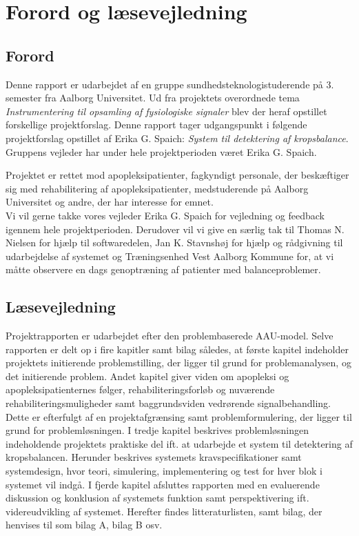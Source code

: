 \chapter*{Forord og læsevejledning}
\section*{Forord}
Denne rapport er udarbejdet af en gruppe sundhedsteknologistuderende på 3. semester fra Aalborg Universitet. Ud fra projektets overordnede tema \textit{Instrumentering til opsamling af fysiologiske signaler} blev der heraf opstillet forskellige projektforslag. Denne rapport tager udgangspunkt i følgende projektforslag opstillet af Erika G. Spaich: \textit{System til detektering af kropsbalance}. Gruppens vejleder har under hele projektperioden været Erika G. Spaich.

Projektet er rettet mod apopleksipatienter, fagkyndigt personale, der beskæftiger sig med rehabilitering af apopleksipatienter, medstuderende på Aalborg Universitet og andre, der har interesse for emnet. \\
Vi vil gerne takke vores vejleder Erika G. Spaich for vejledning og feedback igennem hele projektperioden. Derudover vil vi give en særlig tak til Thomas N. Nielsen for hjælp til softwaredelen, Jan K. Stavnshøj for hjælp og rådgivning til udarbejdelse af systemet og Træningsenhed Vest Aalborg Kommune for, at vi måtte observere en dags genoptræning af patienter med balanceproblemer. 

\section*{Læsevejledning}
Projektrapporten er udarbejdet efter den problembaserede AAU-model. Selve rapporten er delt op i fire kapitler samt bilag således, at første kapitel indeholder projektets initierende problemstilling, der ligger til grund for problemanalysen, og det initierende problem. Andet kapitel giver viden om apopleksi og apopleksipatienternes følger, rehabiliteringsforløb og nuværende rehabiliteringsmuligheder samt baggrundsviden vedrørende signalbehandling. Dette er efterfulgt af en projektafgrænsing samt problemformulering, der ligger til grund for problemløsningen. I tredje kapitel beskrives problemløsningen indeholdende projektets praktiske del ift. at udarbejde et system til detektering af kropsbalancen. Herunder beskrives systemets kravspecifikationer samt systemdesign, hvor teori, simulering, implementering og test for hver blok i systemet vil indgå. I fjerde kapitel afsluttes rapporten med en evaluerende diskussion og konklusion af systemets funktion samt perspektivering ift. videreudvikling af systemet. Herefter findes litteraturlisten, samt bilag, der henvises til som bilag A, bilag B osv. 

